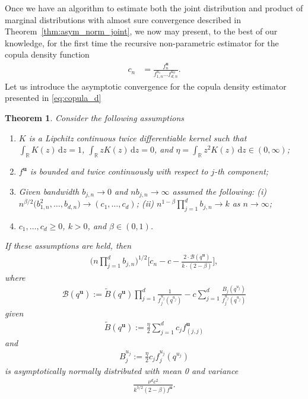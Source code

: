 \documentclass[12pt]{article}
\newtheorem{theorem}{Theorem}
\begin{document}
	Once we have an algorithm to estimate both the joint distribution and product of marginal distributions with almost sure convergence described in Theorem~\ref{thm:asym_norm_joint}, we now may present, to the best of our knowledge, for the first time the recursive non-parametric estimator for the copula density function
	\begin{align}
		c_n &= \frac{f^{\mathbf{u}}_n}{f^{u_1}_{1, n} \dots  f^{u_d}_{d, n}}. \label{eq:copula_d}
	\end{align}
	Let us introduce the asymptotic convergence for the copula density estimator presented in \eqref{eq:copula_d} 
	\begin{theorem}
		Consider the following assumptions
		\begin{enumerate}
			\item $ K $ is a Lipchitz continuous twice differentiable kernel such that $ \int_\mathbb{R} K(z)\, \text{d}z = 1 $, $ \int_\mathbb{R} zK(z)\, \text{d}z = 0 $, and $\eta = \int_\mathbb{R} z^2K(z)\, \text{d}z \in (0, \infty) $;
			\item $ f^{\mathbf{u}} $ is bounded and twice continuously with respect to $ j $-th component;
			\item Given bandwidth $ b_{j, n} \rightarrow 0 $ and $ nb_{j, n} \rightarrow \infty $ assumed the following: (i) $ n^{\beta/2}\big(b_{1, n}^2, \dots, b_{d, n}\big)\rightarrow (c_1, \dots, c_d) $; (ii) $ n^{1-\beta}\prod_{j=1}^{d}b_{j, n} \rightarrow k $ as $ n \rightarrow \infty $;
			\item $ c_1, \dots, c_d \geq 0 $, $ k > 0 $, and $ \beta \in (0, 1) $.
		\end{enumerate}
		If these assumptions are held, then 
		\begin{align}
			\Bigg(n\prod_{j=1}^{d}b_{j, n}\Bigg)^{1/2} \Bigg[c_n -c - \frac{2\cdot\mathcal{B}(q^{\mathbf{u}})}{k\cdot(2-\beta)}\Bigg], 
		\end{align}
		where 
		\begin{align}
			\mathcal{B}(q^{\mathbf{u}}) := \widetilde{B}(q^{\mathbf{u}})\prod_{j=1}^{d}\frac{1}{f_j^{u_j}(q^{u_j})} - c \sum_{j=1}^{d} \frac{B_j(q^{u_j})}{f_j^{u_j}(q^{u_j})}
		\end{align}
		given
		\begin{align}
			\widetilde{B}(q^{\mathbf{u}}) := \frac{\eta}{2}\sum_{j=1}^{d}c_j f^{\mathbf{u}}_{(j, j)}
		\end{align}
		and
		\begin{align}
			B_j^{u_j} := \frac{\eta}{2} c_j f_j^{u_j}(q^{u_j})
		\end{align}
		is asymptotically normally distributed with mean 0 and variance 
		\begin{align}
			\frac{\nu^dc^2}{k^{3/2}(2-\beta)f^{\mathbf{u}}}.
		\end{align}
	\end{theorem}
	
\end{document}
